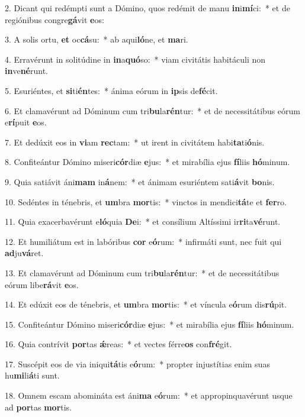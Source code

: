 2. Dicant qui redémpti sunt a Dómino, quos redémit de manu \textbf{in}i\textbf{mí}ci:~*  et de regiónibus congre\textbf{gá}vit \textbf{e}os:\

3. A solis ortu, \textbf{et} oc\textbf{cá}su:~*  ab aqui\textbf{ló}ne, et \textbf{ma}ri.\

4. Erravérunt in solitúdine in \textbf{in}a\textbf{quó}so:~*  viam civitátis habitáculi non \textbf{in}ve\textbf{né}runt.\

5. Esuriéntes, et \textbf{si}ti\textbf{én}tes:~*  ánima eórum in \textbf{ip}sis de\textbf{fé}cit.\

6. Et clamavérunt ad Dóminum cum tri\textbf{bu}la\textbf{rén}tur:~*  et de necessitátibus eórum e\textbf{rí}puit \textbf{e}os.\

7. Et dedúxit eos in \textbf{vi}am \textbf{rec}tam:~*  ut irent in civitátem habi\textbf{ta}ti\textbf{ó}nis.\

8. Confiteántur Dómino miseri\textbf{cór}diæ \textbf{e}jus:~*  et mirabília ejus \textbf{fí}liis \textbf{hó}minum.\

9. Quia satiávit áni\textbf{mam} in\textbf{á}nem:~*  et ánimam esuriéntem sati\textbf{á}vit \textbf{bo}nis.\

10. Sedéntes in ténebris, et \textbf{um}bra \textbf{mor}tis:~*  vinctos in mendici\textbf{tá}te et \textbf{fer}ro.\

11. Quia exacerbavérunt e\textbf{ló}quia \textbf{De}i:~*  et consílium Altíssimi ir\textbf{ri}ta\textbf{vé}runt.\

12. Et humiliátum est in labóribus \textbf{cor} e\textbf{ó}rum:~*  infirmáti sunt, nec fuit qui \textbf{ad}ju\textbf{vá}ret.\

13. Et clamavérunt ad Dóminum cum tri\textbf{bu}la\textbf{rén}tur:~*  et de necessitátibus eórum libe\textbf{rá}vit \textbf{e}os.\

14. Et edúxit eos de ténebris, et \textbf{um}bra \textbf{mor}tis:~*  et víncula e\textbf{ó}rum dis\textbf{rú}pit.\

15. Confiteántur Dómino miseri\textbf{cór}diæ \textbf{e}jus:~*  et mirabília ejus \textbf{fí}liis \textbf{hó}minum.\

16. Quia contrívit \textbf{por}tas \textbf{ǽ}reas:~*  et vectes férre\textbf{os} con\textbf{fré}git.\

17. Suscépit eos de via iniqui\textbf{tá}tis e\textbf{ó}rum:~*  propter injustítias enim suas hu\textbf{mi}li\textbf{á}ti sunt.\

18. Omnem escam abomináta est áni\textbf{ma} e\textbf{ó}rum:~*  et appropinquavérunt usque ad \textbf{por}tas \textbf{mor}tis.\

